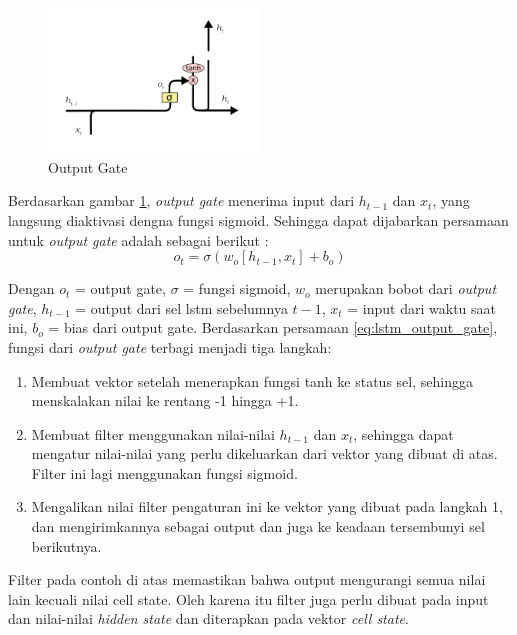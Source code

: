 \documentclass[./skripsi.tex]{subfiles}
\begin{document}
\begin{figure}%
    \centering
    \includegraphics[width=0.5\textwidth]{public/assets/img/OutputGate1.png}
    \caption{Output Gate}
    \label{fig:lstm_output_gate}
\end{figure}
\par Berdasarkan gambar \ref{fig:lstm_output_gate}, \textit{output gate} menerima input dari $h_{t-1}$ dan $x_t$, yang langsung diaktivasi dengna fungsi sigmoid. Sehingga dapat dijabarkan persamaan untuk \textit{output gate} adalah sebagai berikut :
\begin{equation}
    o_t = \sigma (w_o[h_{t-1},x_t]+b_o)
    \label{eq:lstm_output_gate}
\end{equation}
\par Dengan $o_t$ = output gate, $\sigma$ = fungsi sigmoid, $w_o$ merupakan bobot dari \textit{output gate}, $h_{t-1}$ = output dari sel lstm sebelumnya $t-1$, $x_t$ = input dari waktu saat ini, $b_o$ = bias dari output gate. Berdasarkan persamaan \ref{eq:lstm_output_gate}, fungsi dari \textit{output gate} terbagi menjadi tiga langkah:
\begin{enumerate}
    \item Membuat vektor setelah menerapkan fungsi tanh ke status sel, sehingga menskalakan nilai ke rentang -1 hingga +1.
    \item Membuat filter menggunakan nilai-nilai $h_{t-1}$ dan $x_t$, sehingga dapat mengatur nilai-nilai yang perlu dikeluarkan dari vektor yang dibuat di atas. Filter ini lagi menggunakan fungsi sigmoid.
    \item  Mengalikan nilai filter pengaturan ini ke vektor yang dibuat pada langkah 1, dan mengirimkannya sebagai output dan juga ke keadaan tersembunyi sel berikutnya.
\end{enumerate}
\par Filter pada contoh di atas memastikan bahwa output mengurangi semua nilai lain kecuali nilai cell state. Oleh karena itu filter juga perlu dibuat pada input dan nilai-nilai \textit{hidden state} dan diterapkan pada vektor \textit{cell state}.
\cite{gers1999learning}
\end{document}
